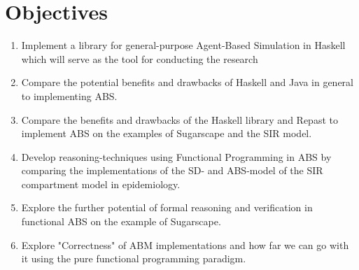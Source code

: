 \section{Objectives}
\begin{enumerate}
	\item Implement a library for general-purpose Agent-Based Simulation in Haskell which will serve as the tool for conducting the research 
	
	\item Compare the potential benefits and drawbacks of Haskell and Java in general to implementing ABS.
	
	\item Compare the benefits and drawbacks of the Haskell library and Repast to implement ABS on the examples of Sugarscape and the SIR model.
	
	\item Develop reasoning-techniques using Functional Programming in ABS by comparing the implementations of the SD- and ABS-model of the SIR compartment model in epidemiology.
	
	\item Explore the further potential of formal reasoning and verification in functional ABS on the example of Sugarscape.
	
	\item Explore "Correctness" of ABM implementations and how far we can go with it using the pure functional programming paradigm.
\end{enumerate}

